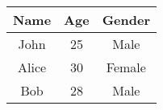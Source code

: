 \documentclass{article}
\begin{document}
\begin{table}[h!]
\centering
\begin{tabular}{|c|c|c|}
\hline
Name & Age & Gender \\
\hline
John & 25 & Male \\
\hline
Alice & 30 & Female \\
\hline
Bob & 28 & Male \\
\hline
\end{tabular}
\end{table}
\end{document}
